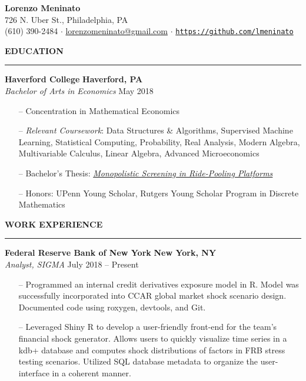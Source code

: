 \documentclass[paper=a4, fontsize=11pt]{scrartcl} %
\newcommand{\I}{--}
\newenvironment{mycenter}[1][\topsep]
  {\setlength{\topsep}{#1}\par\kern\topsep\centering}%
  {\par\kern\topsep}%
\begin{document}
\begin{mycenter}
\textbf{\LARGE Lorenzo Meninato} \\
726 N. Uber St., Philadelphia, PA \\
(610) 390-2484 $\cdot$ \href{mailto:lorenzomeninato@gmail.com}{lorenzomeninato@gmail.com} $\cdot$ \texttt{\href{https://github.com/lmeninato}{https://github.com/lmeninato}}

\end{mycenter}

\begin{mycenter}[0pt]
\textsc{\textbf{EDUCATION}}
\end{mycenter}

\vspace{-3mm}
\rule{\textwidth}{0.4pt}

\textbf{Haverford College} \hfill  \textbf{Haverford, PA} \\
\textit{Bachelor of Arts in Economics} \hfill May 2018

\begin{itemize}[topsep=0pt,noitemsep]
    \item[\I] Concentration in Mathematical Economics
	\item[\I] \textit{Relevant Coursework}: Data Structures \& Algorithms, Supervised Machine Learning, Statistical Computing, Probability, Real Analysis, Modern Algebra, Multivariable Calculus, Linear Algebra, Advanced Microeconomics
	\item[\I] Bachelor's Thesis: \textit{\href{https://github.com/lmeninato/ECON396/blob/master/Lorenzo\%20Meninato\%20Thesis.pdf}{Monopolistic Screening in Ride-Pooling Platforms}}
	\item[\I] Honors: UPenn Young Scholar, Rutgers Young Scholar Program in Discrete Mathematics
\end{itemize}

\vspace{2mm}

\begin{mycenter}[0pt]
\textsc{\textbf{WORK EXPERIENCE}}
\end{mycenter}

\vspace{-3mm}
\rule{\textwidth}{0.4pt}

\textbf{Federal Reserve Bank of New York} \hfill \textbf{New York, NY} \\
\textit{Analyst, SIGMA} \hfill July 2018 -- Present
\begin{itemize}[topsep=0pt,noitemsep]
	\item[\I] Programmed an internal credit derivatives exposure model in R. Model was successfully incorporated into CCAR global market shock scenario design. Documented code using roxygen, devtools, and Git. 
	\item[\I] Leveraged Shiny R to develop a user-friendly front-end for the team's financial shock generator. Allows users to quickly visualize time series in a kdb+ database and computes shock distributions of factors in FRB stress testing scenarios. Utilized SQL database metadata to organize the user-interface in a coherent manner. 
\end{itemize}
\end{document}

